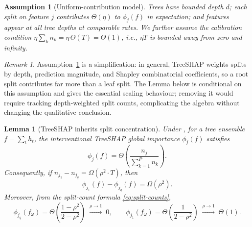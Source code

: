 \documentclass[11pt]{article}
\newtheorem{lemma}[theorem]{Lemma}
\newtheorem{assumption}[theorem]{Assumption}
\theoremstyle{remark}
\newtheorem{remark}[theorem]{Remark}
\newcommand{\phij}{\phi_j}                  %
\newcommand{\splits}[1]{n_{#1}}             %
\newcommand{\totalT}{T}                     %
\newcommand{\rhovar}{\rho}                  %
\begin{document}
\begin{assumption}[Uniform-contribution model]
\label{ass:uniform}
Trees have bounded depth $d$; each split on feature $j$ contributes
$\Theta(\eta)$ to $\phij(f)$ in expectation; and features appear at all
tree depths at comparable rates.  We further assume the calibration
condition $\eta \sum_k n_k = \eta\,\Theta(T) = \Theta(1)$, i.e., $\eta T$
is bounded away from zero and infinity.
\end{assumption}

\begin{remark}
Assumption~\ref{ass:uniform} is a simplification: in general, TreeSHAP
weights splits by depth, prediction magnitude, and Shapley combinatorial
coefficients, so a root split contributes far more than a leaf split.
The Lemma below is conditional on this assumption and gives the essential
scaling behaviour; removing it would require tracking depth-weighted
split counts, complicating the algebra without changing the qualitative
conclusion.
\end{remark}

\begin{lemma}[TreeSHAP inherits split concentration]
\label{lem:shap-inherits}
Under , for a tree ensemble $f = \sum_{t} h_t$,
the interventional TreeSHAP global importance $\phij(f)$ satisfies
\begin{equation}
  \phij(f) = \Theta\!\left(
    \frac{\splits{j}}{\sum_{k=1}^{P} \splits{k}}
  \right).
  \label{eq:shap-splits}
\end{equation}
Consequently, if $\splits{j_1} - \splits{j_q} = \Omega(\rhovar^2 \cdot
\totalT)$, then
\begin{equation}
  \phi_{j_1}(f) - \phi_{j_q}(f) = \Omega(\rhovar^2).
  \label{eq:shap-gap}
\end{equation}
Moreover, from the split-count formula \eqref{eq:split-counts},
\begin{equation}
  \phi_{j_q}(f_\omega) = \Theta\!\left(\frac{1-\rho^2}{2-\rho^2}\right)
  \;\xrightarrow{\rho\to 1}\; 0,
  \qquad
  \phi_{j_1}(f_\omega) = \Theta\!\left(\frac{1}{2-\rho^2}\right)
  \;\xrightarrow{\rho\to 1}\; \Theta(1).
  \label{eq:shap-limits}
\end{equation}
\end{lemma}
\end{document}
